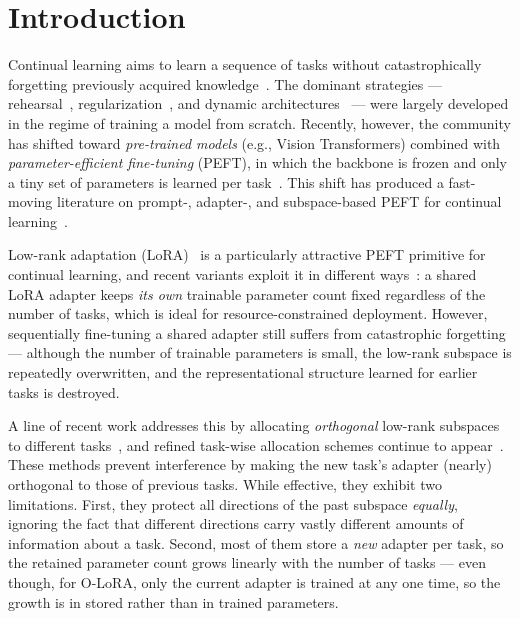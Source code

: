 \section{Introduction}
\label{sec:intro}

Continual learning aims to learn a sequence of tasks without catastrophically
forgetting previously acquired knowledge~\cite{french1999catastrophic}. The dominant
strategies --- rehearsal~\cite{rebuffi2017icarl}, regularization~\cite{kirkpatrick2017overcoming,zenke2017continual},
and dynamic architectures~\cite{rusu2016progressive} --- were largely developed in the
regime of training a model from scratch. Recently, however, the community has shifted
toward \emph{pre-trained models} (e.g., Vision Transformers) combined with
\emph{parameter-efficient fine-tuning} (PEFT), in which the backbone is frozen and only a
tiny set of parameters is learned per task~\cite{wang2022l2p,smith2023coda,wang2023olora}.
This shift has produced a fast-moving literature on prompt-, adapter-, and
subspace-based PEFT for continual
learning~\cite{zhou2024ptmsurvey,zhou2025revisitingcil,coleman2026peftsurvey,razavifar2026harsh,leo2024survey}.

Low-rank adaptation (LoRA)~\cite{hu2022lora} is a particularly attractive PEFT primitive
for continual learning, and recent variants exploit it in different
ways~\cite{wu2025sdlora,he2025cllora,zhu2025bilora,wei2025onlinelora}: a shared LoRA
adapter keeps \emph{its own} trainable parameter count fixed
regardless of the number of tasks, which is ideal for resource-constrained deployment.
However, sequentially fine-tuning a shared adapter still suffers from catastrophic
forgetting --- although the number of trainable parameters is small, the low-rank
subspace is repeatedly overwritten, and the representational structure learned for
earlier tasks is destroyed.

A line of recent work addresses this by allocating \emph{orthogonal} low-rank subspaces
to different tasks~\cite{wang2023olora,liang2024inflora}, and refined task-wise allocation
schemes continue to appear~\cite{zhou2024ease,wang2025plan,huang2026gradtaskorg}. These methods prevent
interference by making the new task's adapter (nearly) orthogonal to those of previous
tasks. While effective, they exhibit two limitations. First, they protect all directions
of the past subspace \emph{equally}, ignoring the fact that different directions carry
vastly different amounts of information about a task. Second, most of them store a
\emph{new} adapter per task, so the retained parameter count grows linearly with the
number of tasks --- even though, for O-LoRA, only the current adapter is trained at any one
time, so the growth is in stored rather than in trained parameters.

